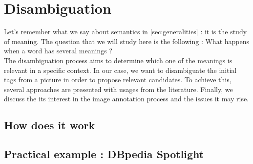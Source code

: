 
\chapter{Disambiguation} %

\label{chapter:Disambiguation} %


Let's remember what we say about semantics in \ref{sec:generalities} : it is the study of meaning. The question that we will study here is the following : What happens when a word has several meanings ?\\
The disambiguation process aims to determine which one of the meanings is relevant in a specific context. In our case, we want to disambiguate the initial tags from a picture in order to propose relevant candidates. To achieve this, several approaches are presented with usages from the literature. Finally, we discuss the its interest in the image annotation process and the issues it may rise. 

\section{How does it work} %
\label{sec:how_does_it_work}


\section{Practical example : DBpedia Spotlight} %
\label{sec:dbpedia_spotlight}

